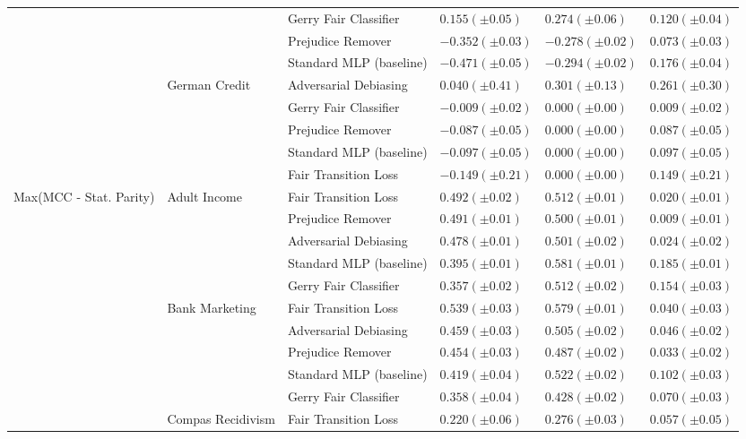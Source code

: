 \begin{tabular}{llllll}
 &  & Gerry Fair Classifier & $0.155 (\pm0.05)$ & $0.274 (\pm0.06)$ & $0.120 (\pm0.04)$ \\
 &  & Prejudice Remover & $-0.352 (\pm0.03)$ & $-0.278 (\pm0.02)$ & $0.073 (\pm0.03)$ \\
 &  & Standard MLP (baseline) & $-0.471 (\pm0.05)$ & $-0.294 (\pm0.02)$ & $0.176 (\pm0.04)$ \\
\cline{2-6}
 & \multirow[t]{5}{*}{German Credit} & Adversarial Debiasing & $0.040 (\pm0.41)$ & $0.301 (\pm0.13)$ & $0.261 (\pm0.30)$ \\
 &  & Gerry Fair Classifier & $-0.009 (\pm0.02)$ & $0.000 (\pm0.00)$ & $0.009 (\pm0.02)$ \\
 &  & Prejudice Remover & $-0.087 (\pm0.05)$ & $0.000 (\pm0.00)$ & $0.087 (\pm0.05)$ \\
 &  & Standard MLP (baseline) & $-0.097 (\pm0.05)$ & $0.000 (\pm0.00)$ & $0.097 (\pm0.05)$ \\
 &  & Fair Transition Loss & $-0.149 (\pm0.21)$ & $0.000 (\pm0.00)$ & $0.149 (\pm0.21)$ \\
\cline{1-6} \cline{2-6}
\multirow[t]{20}{*}{Max(MCC - Stat. Parity)} & \multirow[t]{5}{*}{Adult Income} & Fair Transition Loss & $0.492 (\pm0.02)$ & $0.512 (\pm0.01)$ & $0.020 (\pm0.01)$ \\
 &  & Prejudice Remover & $0.491 (\pm0.01)$ & $0.500 (\pm0.01)$ & $0.009 (\pm0.01)$ \\
 &  & Adversarial Debiasing & $0.478 (\pm0.01)$ & $0.501 (\pm0.02)$ & $0.024 (\pm0.02)$ \\
 &  & Standard MLP (baseline) & $0.395 (\pm0.01)$ & $0.581 (\pm0.01)$ & $0.185 (\pm0.01)$ \\
 &  & Gerry Fair Classifier & $0.357 (\pm0.02)$ & $0.512 (\pm0.02)$ & $0.154 (\pm0.03)$ \\
\cline{2-6}
 & \multirow[t]{5}{*}{Bank Marketing} & Fair Transition Loss & $0.539 (\pm0.03)$ & $0.579 (\pm0.01)$ & $0.040 (\pm0.03)$ \\
 &  & Adversarial Debiasing & $0.459 (\pm0.03)$ & $0.505 (\pm0.02)$ & $0.046 (\pm0.02)$ \\
 &  & Prejudice Remover & $0.454 (\pm0.03)$ & $0.487 (\pm0.02)$ & $0.033 (\pm0.02)$ \\
 &  & Standard MLP (baseline) & $0.419 (\pm0.04)$ & $0.522 (\pm0.02)$ & $0.102 (\pm0.03)$ \\
 &  & Gerry Fair Classifier & $0.358 (\pm0.04)$ & $0.428 (\pm0.02)$ & $0.070 (\pm0.03)$ \\
\cline{2-6}
 & \multirow[t]{5}{*}{Compas Recidivism} & Fair Transition Loss & $0.220 (\pm0.06)$ & $0.276 (\pm0.03)$ & $0.057 (\pm0.05)$ \\

\end{tabular}
